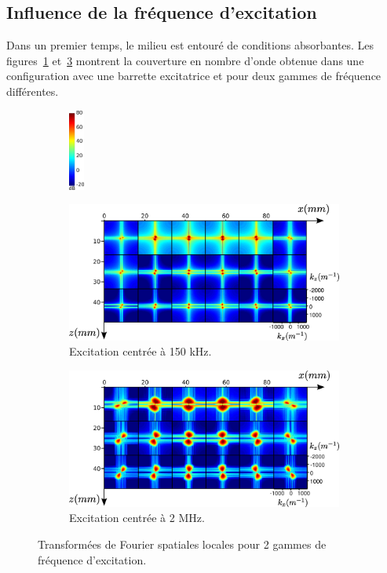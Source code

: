 \subsection{Influence de la fréquence d'excitation}

Dans un premier temps, le milieu est entouré de conditions absorbantes. Les figures~\ref{app:150k} et~\ref{app:2M} montrent la couverture en nombre d'onde obtenue dans une configuration avec une barrette excitatrice et pour deux gammes de fréquence différentes. 
    
\begin{figure}[!h]
    \centering
    \begin{subfigure}[b]{0.05\textwidth}
 		\hspace{-2cm}\includegraphics[width=0.5cm]{img/echelle_fft.png}\vspace{2.1cm}
	\end{subfigure}
    \begin{subfigure}[b]{0.4\textwidth}
		\hspace{-3cm}\includegraphics[width=1.5\textwidth]{img/ssfreesurf_150k}
		\caption{Excitation centrée à 150 kHz.}
		\label{app:150k}
	\end{subfigure}	
	\begin{subfigure}[b]{0.4\textwidth}
		\includegraphics[width=1.5\textwidth]{img/fft2d_nofreesurf_2MHz.png}
		\caption{Excitation centrée à 2 MHz.}
		\label{app:2M}
	\end{subfigure}
	\caption{Transformées de Fourier spatiales locales pour 2 gammes de fréquence d'excitation.}
\end{figure}

